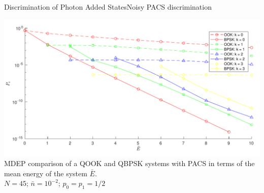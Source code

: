 
\begin{frame}{Discrimination of Photon Added States}{Noisy PACS discrimination}
    \begin{center}
        \includegraphics[width=1\textwidth]{Pictures/fig3.4.pdf}\\
        \scriptsize{
        MDEP comparison of a QOOK and QBPSK systems with PACS in terms of the mean energy of the system $\bar{E}$.\\
        $N=45$; $\bar{n}=10^{-2}$; $p_0=p_1=1/2$
        }
    \end{center}
    \ \mbox{}\\ \ \mbox{}\\
\end{frame}